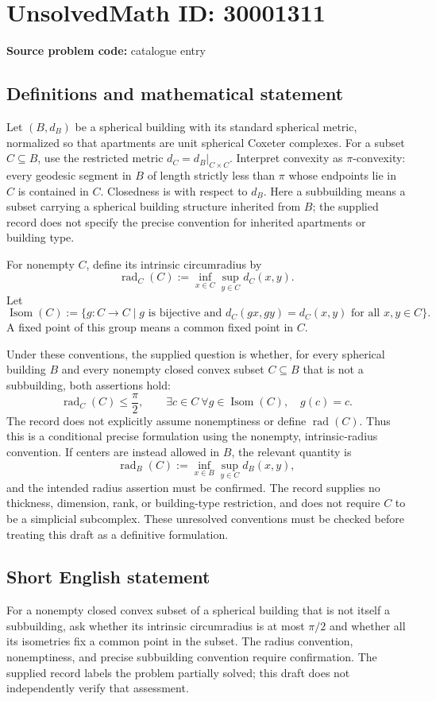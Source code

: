 \documentclass[11pt]{article}
\begin{document}
\section*{UnsolvedMath ID: 30001311}
\textbf{Source problem code:} catalogue entry
\subsection{Definitions and mathematical statement}
Let \((B,d_B)\) be a spherical building with its standard spherical metric, normalized so that apartments are unit spherical Coxeter complexes. For a subset \(C\subseteq B\), use the restricted metric \(d_C=d_B|_{C\times C}\). Interpret convexity as \(\pi\)-convexity: every geodesic segment in \(B\) of length strictly less than \(\pi\) whose endpoints lie in \(C\) is contained in \(C\). Closedness is with respect to \(d_B\). Here a subbuilding means a subset carrying a spherical building structure inherited from \(B\); the supplied record does not specify the precise convention for inherited apartments or building type.

For nonempty \(C\), define its intrinsic circumradius by
\[
\operatorname{rad}_C(C):=\inf_{x\in C}\sup_{y\in C}d_C(x,y).
\]
Let
\[
\operatorname{Isom}(C):=\{g:C\to C\mid g\text{ is bijective and }d_C(gx,gy)=d_C(x,y)\text{ for all }x,y\in C\}.
\]
A fixed point of this group means a common fixed point in \(C\).

Under these conventions, the supplied question is whether, for every spherical building \(B\) and every nonempty closed convex subset \(C\subseteq B\) that is not a subbuilding, both assertions hold:
\[
\operatorname{rad}_C(C)\leq\frac{\pi}{2},
\qquad
\exists c\in C\ \forall g\in\operatorname{Isom}(C),\quad g(c)=c.
\]
The record does not explicitly assume nonemptiness or define \(\operatorname{rad}(C)\). Thus this is a conditional precise formulation using the nonempty, intrinsic-radius convention. If centers are instead allowed in \(B\), the relevant quantity is
\[
\operatorname{rad}_B(C):=\inf_{x\in B}\sup_{y\in C}d_B(x,y),
\]
and the intended radius assertion must be confirmed. The record supplies no thickness, dimension, rank, or building-type restriction, and does not require \(C\) to be a simplicial subcomplex. These unresolved conventions must be checked before treating this draft as a definitive formulation.
\subsection{Short English statement}
For a nonempty closed convex subset of a spherical building that is not itself a subbuilding, ask whether its intrinsic circumradius is at most \(\pi/2\) and whether all its isometries fix a common point in the subset. The radius convention, nonemptiness, and precise subbuilding convention require confirmation. The supplied record labels the problem partially solved; this draft does not independently verify that assessment.
\end{document}
